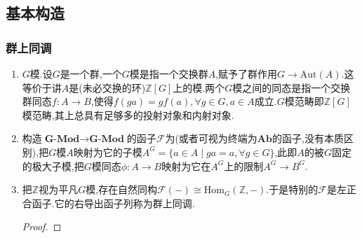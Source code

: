 \subsection{基本构造}
\subsubsection{群上同调}
\begin{enumerate}
	\item $G$模.设$G$是一个群,一个$G$模是指一个交换群$A$,赋予了群作用$G\to\mathrm{Aut}(A)$.这等价于讲$A$是(未必交换的环)$\mathbb{Z}[G]$上的模.两个$G$模之间的同态是指一个交换群同态$f:A\to B$,使得$f(ga)=gf(a),\forall g\in G,a\in A$成立.$G$模范畴即$\mathbb{Z}[G]$模范畴,其上总具有足够多的投射对象和内射对象.
	\item 构造$\textbf{G-Mod}\to\textbf{G-Mod}$的函子$\mathscr{F}$为(或者可视为终端为$\textbf{Ab}$的函子,没有本质区别),把$G$模$A$映射为它的子模$A^G=\{a\in A\mid ga=a,\forall g\in G\}$,此即$A$的被$G$固定的极大子模,把$G$模同态$\phi:A\to B$映射为它在$A^G$上的限制$A^G\to B^G$.
	\item 把$\mathbb{Z}$视为平凡$G$模,存在自然同构$\mathscr{F}(-)\cong\mathrm{Hom}_G(\mathbb{Z},-)$.于是特别的$\mathscr{F}$是左正合函子.它的右导出函子列称为群上同调.
	\begin{proof}
		

\end{proof}
\end{enumerate}

